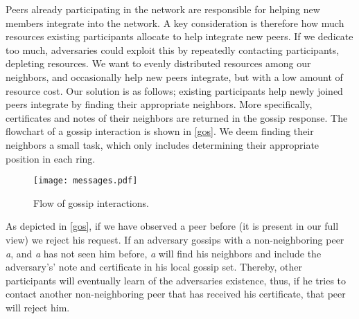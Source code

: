 \documentclass[USenglish]{uit-thesis}
\begin{document}
Peers already participating in the network are responsible for helping new members integrate into the network.
A key consideration is therefore how much resources existing participants allocate to help integrate new peers.
If we dedicate too much, adversaries could exploit this by repeatedly contacting participants, depleting resources.
We want to evenly distributed resources among our neighbors, and occasionally help new peers integrate, but with a low amount of resource cost.
Our solution is as follows; existing participants help newly joined peers integrate by finding their appropriate neighbors.
More specifically, certificates and notes of their neighbors are returned in the gossip response.    
The flowchart of a gossip interaction is shown in \autoref{gos}.
We deem finding their neighbors a small task, which only includes determining their appropriate position in each ring.
\begin{figure}[h]
	\centering
	\texttt{[image: messages.pdf]}
	\caption{Flow of gossip interactions.}
	\label{gos}
\end{figure}
As depicted in \autoref{gos}, if we have observed a peer before (it is present in our full view) we reject his request.
If an adversary gossips with a non-neighboring peer \textit{a}, and \textit{a} has not seen him before, \textit{a} will find his neighbors and include the adversary's' note and certificate in his local gossip set. 
Thereby, other participants will eventually learn of the adversaries existence, thus, if he tries to contact another non-neighboring peer that has received his certificate, that peer will reject him.
\end{document}

